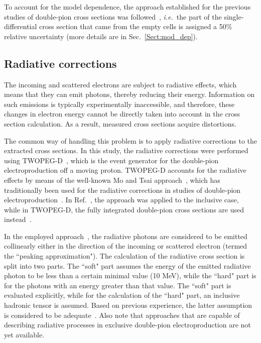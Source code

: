 \documentclass[prc,twocolumn,superscriptaddress,showpacs,amssymb,amsmath,amsfonts,aps,nofootinbib]{revtex4-1}
\begin{document}
To account for the model dependence, the approach established for the previous studies of double-pion cross sections was followed~\cite{Isupov:2017lnd,Fed_an_note:2017,Golovach}, {\it i.e.}~the part of the single-differential cross section that came from the empty cells is assigned a 50\% relative uncertainty (more details are in Sec.\!~\ref{Sect:mod_dep}).


\subsection{Radiative corrections}
\label{Sect:rad_corr}

The incoming and scattered electrons are subject to radiative effects, which means that they can emit photons, thereby reducing their energy. Information on such emissions is typically experimentally inaccessible, and therefore, these changes in electron energy cannot be directly taken into account in the cross section calculation. As a result, measured cross sections acquire distortions.


The common way of handling this problem is to apply radiative corrections to the extracted cross sections. In this study, the radiative corrections were performed using TWOPEG-D~\cite{twopeg-d}, which is the event generator for the double-pion electroproduction off a moving proton. TWOPEG-D accounts for the radiative effects by means of the well-known Mo and Tsai approach~\cite{Mo:1968cg}, which has traditionally been used for the radiative corrections in studies of double-pion electroproduction~\cite{Rip_an_note:2002,Ripani:2002ss,Fed_an_note:2007,Fedotov:2008aa,Fed_an_note:2017,Fed_paper_2018,Isupov:2017lnd,Arjun}. In Ref.\!~\cite{Mo:1968cg}, the approach was applied to the inclusive case, while in TWOPEG-D, the fully integrated double-pion cross sections are used instead~\cite{twopeg,twopeg-d}. 

In the employed approach~\cite{Mo:1968cg,twopeg,twopeg-d}, the radiative photons are considered to be emitted collinearly either in the direction of the incoming or scattered electron (termed the ``peaking approximation"). The calculation of the radiative cross section is split into two parts. The ``soft" part assumes the energy of the emitted radiative photon to be less than a certain minimal value (10 MeV), while the ``hard" part is for the photons with an energy greater than that value. The ``soft" part is evaluated explicitly, while for the calculation of the ``hard" part, an inclusive hadronic tensor is assumed. Based on previous experience, the latter assumption is considered to be adequate~\cite{Rip_an_note:2002,Ripani:2002ss,Fed_an_note:2007,Fedotov:2008aa,Fed_an_note:2017,Fed_paper_2018,Isupov:2017lnd,Arjun}. Also note that approaches that are capable of describing radiative processes in exclusive double-pion electroproduction are not yet available.
\end{document}
